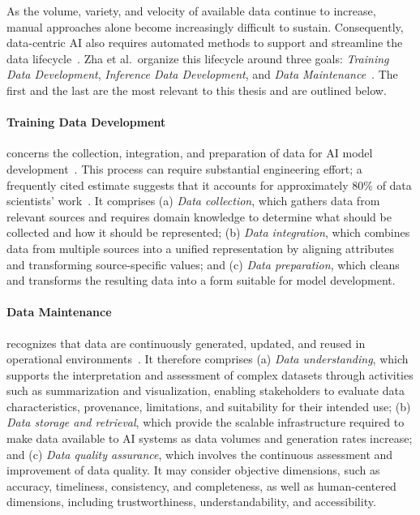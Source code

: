 
As the volume, variety, and velocity of available data continue to increase, manual approaches alone become increasingly difficult to sustain. Consequently, data-centric AI also requires automated methods to support and streamline the data lifecycle~\cite{zha_data-centric_2025}. Zha et al.\ organize this lifecycle around three goals: \emph{Training Data Development}, \emph{Inference Data Development}, and \emph{Data Maintenance}~\cite{zha_data-centric_2025}. The first and the last are the most relevant to this thesis and are outlined below.

\paragraph{Training Data Development} concerns the collection, integration, and preparation of data for AI model development~\cite{zha_data-centric_2025}. This process can require substantial engineering effort; a frequently cited estimate suggests that it accounts for approximately 80\% of data scientists' work~\cite{press_cleaning_2020}. It comprises (a) \emph{Data collection}, which gathers data from relevant sources and requires domain knowledge to determine what should be collected and how it should be represented; (b) \emph{Data integration}, which combines data from multiple sources into a unified representation by aligning attributes and transforming source-specific values; and (c) \emph{Data preparation}, which cleans and transforms the resulting data into a form suitable for model development.

\paragraph{Data Maintenance} recognizes that data are continuously generated, updated, and reused in operational environments~\cite{zha_data-centric_2025}. It therefore comprises (a) \emph{Data understanding}, which supports the interpretation and assessment of complex datasets through activities such as summarization and visualization, enabling stakeholders to evaluate data characteristics, provenance, limitations, and suitability for their intended use; (b) \emph{Data storage and retrieval}, which provide the scalable infrastructure required to make data available to AI systems as data volumes and generation rates increase; and (c) \emph{Data quality assurance}, which involves the continuous assessment and improvement of data quality. It may consider objective dimensions, such as accuracy, timeliness, consistency, and completeness, as well as human-centered dimensions, including trustworthiness, understandability, and accessibility.


